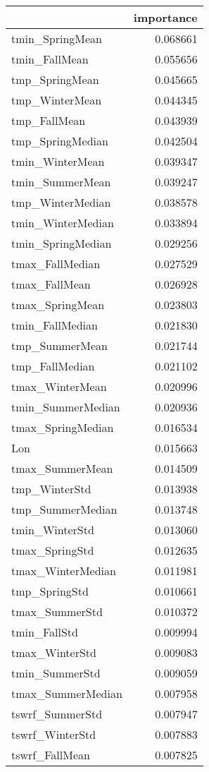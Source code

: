 \begin{tabular}{lr}
\toprule
 & importance \\
\midrule
tmin_SpringMean & 0.068661 \\
tmin_FallMean & 0.055656 \\
tmp_SpringMean & 0.045665 \\
tmp_WinterMean & 0.044345 \\
tmp_FallMean & 0.043939 \\
tmp_SpringMedian & 0.042504 \\
tmin_WinterMean & 0.039347 \\
tmin_SummerMean & 0.039247 \\
tmp_WinterMedian & 0.038578 \\
tmin_WinterMedian & 0.033894 \\
tmin_SpringMedian & 0.029256 \\
tmax_FallMedian & 0.027529 \\
tmax_FallMean & 0.026928 \\
tmax_SpringMean & 0.023803 \\
tmin_FallMedian & 0.021830 \\
tmp_SummerMean & 0.021744 \\
tmp_FallMedian & 0.021102 \\
tmax_WinterMean & 0.020996 \\
tmin_SummerMedian & 0.020936 \\
tmax_SpringMedian & 0.016534 \\
Lon & 0.015663 \\
tmax_SummerMean & 0.014509 \\
tmp_WinterStd & 0.013938 \\
tmp_SummerMedian & 0.013748 \\
tmin_WinterStd & 0.013060 \\
tmax_SpringStd & 0.012635 \\
tmax_WinterMedian & 0.011981 \\
tmp_SpringStd & 0.010661 \\
tmax_SummerStd & 0.010372 \\
tmin_FallStd & 0.009994 \\
tmax_WinterStd & 0.009083 \\
tmin_SummerStd & 0.009059 \\
tmax_SummerMedian & 0.007958 \\
tswrf_SummerStd & 0.007947 \\
tswrf_WinterStd & 0.007883 \\
tswrf_FallMean & 0.007825 \\

\end{tabular}
